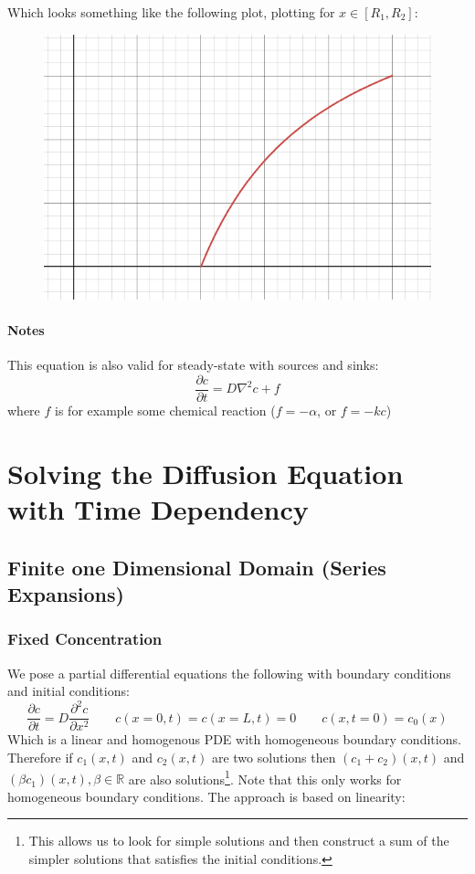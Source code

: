 Which looks something like the following plot, plotting for $x\in[R_1,R_2]$:
\begin{figure}[H]
	\centering
	\includegraphics[width=0.4\linewidth]{Sketches/SpheresDiffusionPlot}
	
	\label{fig:spheresdiffusionplot}
\end{figure}

\paragraph{Notes}
This equation is also valid for steady-state with sources and sinks:
\begin{equation*}
	\frac{\partial c}{\partial t} = D \nabla^2c+f
\end{equation*}
where $f$ is for example some chemical reaction ($f=-\alpha$, or $f=-kc$)


\section{Solving the Diffusion Equation with Time Dependency}

\subsection{Finite one Dimensional Domain (Series Expansions)}
\subsubsection{Fixed Concentration}

We pose a partial differential equations the following with boundary conditions and initial conditions:
\begin{equation*}
	\frac{\partial c}{\partial t} = D\frac{\partial^2 c}{\partial x^2}
	\qquad c(x=0,t)=c(x=L,t)=0\qquad c(x,t=0)=c_0(x)
\end{equation*}
Which is a linear and homogenous PDE  with homogeneous boundary conditions.
Therefore if $c_1(x,t)$ and $c_2(x,t)$ are two solutions then $(c_1+c_2)(x,t)$ and $(\beta c_1)(x,t), \beta \in \mathbb R$ are also solutions\footnote{This allows us to look for simple solutions and then construct a sum of the simpler solutions that satisfies the initial conditions.}. Note that this only works for homogeneous boundary conditions. 
The approach is based on linearity: 

